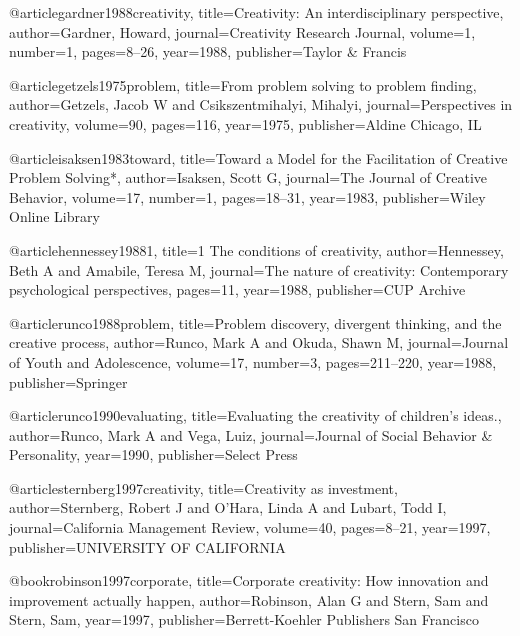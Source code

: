 @article{gardner1988creativity,
  title={Creativity: An interdisciplinary perspective},
  author={Gardner, Howard},
  journal={Creativity Research Journal},
  volume={1},
  number={1},
  pages={8--26},
  year={1988},
  publisher={Taylor \& Francis}
}

@article{getzels1975problem,
  title={From problem solving to problem finding},
  author={Getzels, Jacob W and Csikszentmihalyi, Mihalyi},
  journal={Perspectives in creativity},
  volume={90},
  pages={116},
  year={1975},
  publisher={Aldine Chicago, IL}
}

@article{isaksen1983toward,
  title={Toward a Model for the Facilitation of Creative Problem Solving*},
  author={Isaksen, Scott G},
  journal={The Journal of Creative Behavior},
  volume={17},
  number={1},
  pages={18--31},
  year={1983},
  publisher={Wiley Online Library}
}

@article{hennessey19881,
  title={1 The conditions of creativity},
  author={Hennessey, Beth A and Amabile, Teresa M},
  journal={The nature of creativity: Contemporary psychological perspectives},
  pages={11},
  year={1988},
  publisher={CUP Archive}
}

@article{runco1988problem,
  title={Problem discovery, divergent thinking, and the creative process},
  author={Runco, Mark A and Okuda, Shawn M},
  journal={Journal of Youth and Adolescence},
  volume={17},
  number={3},
  pages={211--220},
  year={1988},
  publisher={Springer}
}

@article{runco1990evaluating,
  title={Evaluating the creativity of children's ideas.},
  author={Runco, Mark A and Vega, Luiz},
  journal={Journal of Social Behavior \& Personality},
  year={1990},
  publisher={Select Press}
}

@article{sternberg1997creativity,
  title={Creativity as investment},
  author={Sternberg, Robert J and O'Hara, Linda A and Lubart, Todd I},
  journal={California Management Review},
  volume={40},
  pages={8--21},
  year={1997},
  publisher={UNIVERSITY OF CALIFORNIA}
}

@book{robinson1997corporate,
  title={Corporate creativity: How innovation and improvement actually happen},
  author={Robinson, Alan G and Stern, Sam and Stern, Sam},
  year={1997},
  publisher={Berrett-Koehler Publishers San Francisco}
}